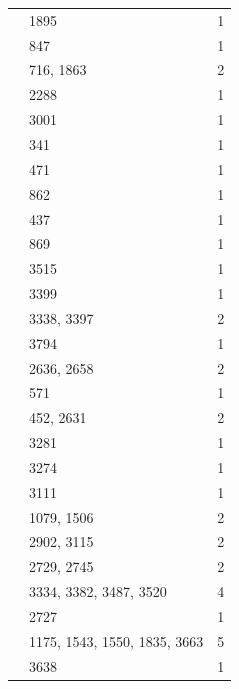 \begin{longtable}{@{}p{}p{}p{}@{}}
\cite[Proposition~24.21 and Theorem~24.24]{MalleTesterman2011} & 1895 & 1 \\
\cite[Remark~24.19 and Table~24.3]{MalleTesterman2011} & 847 & 1 \\
\cite[Tables~24.2--24.3 and Remark~24.19]{MalleTesterman2011} & 716, 1863 & 2 \\
\cite[Theorem~21.11]{MalleTesterman2011} & 2288 & 1 \\
\cite[Theorem~22.5]{MalleTesterman2011} & 3001 & 1 \\
\cite[Definition~3.4]{MartinezRizoRossi2026} & 341 & 1 \\
\cite[Lemma~3.14]{MartinezRizoRossi2026} & 471 & 1 \\
\cite[Lemma~3.6(i)]{MartinezRizoRossi2026} & 862 & 1 \\
\cite[Lemma~6.3]{MartinezRizoRossi2026} & 437 & 1 \\
\cite[Proposition~8.5]{MartinezRizoRossi2026} & 869 & 1 \\
\cite[Corollary~2.10]{Navarro1998} & 3515 & 1 \\
\cite[Lemma~6.1]{Navarro1998} & 3399 & 1 \\
\cite[Theorem~4.14]{Navarro1998} & 3338, 3397 & 2 \\
\cite[Theorem~4.14 and Lemma~6.1]{Navarro1998} & 3794 & 1 \\
\cite[Theorem~8.11]{Navarro1998} & 2636, 2658 & 2 \\
\cite[Theorem~8.12]{Navarro1998} & 571 & 1 \\
\cite[Theorem~9.10]{Navarro1998} & 452, 2631 & 2 \\
\cite[Theorem~9.9(c)]{Navarro1998} & 3281 & 1 \\
\cite[Lemma~2.3(c)]{NavarroTiep2011} & 3274 & 1 \\
\cite[Corollary~4.2]{Ruhstorfer2022Derived} & 3111 & 1 \\
\cite[Corollary~4.2 and Lemmas~4.3 and~4.5]{Ruhstorfer2022Derived} & 1079, 1506 & 2 \\
\cite[Lemma~4.5(a)--(b)]{Ruhstorfer2022Derived} & 2902, 3115 & 2 \\
\cite[Theorem~4.1]{Sambale2012} & 2729, 2745 & 2 \\
\cite[Theorem~13.7]{Sambale2014} & 3334, 3382, 3487, 3520 & 4 \\
\cite[Theorem~8.1]{Sambale2014} & 2727 & 1 \\
\cite[Theorem~5.5]{SchaefferFry2014} & 1175, 1543, 1550, 1835, 3663 & 5 \\
\cite[proof of Theorem~5.5]{SchaefferFry2014} & 3638 & 1 \\

\end{longtable}
